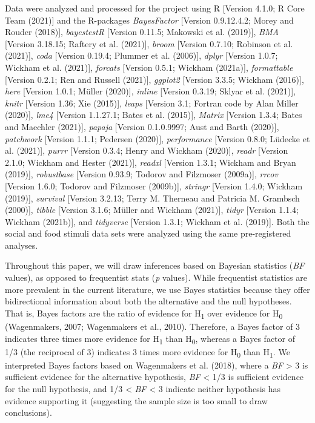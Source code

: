 \documentclass[
  english,
  ,doc,floatsintext]{apa6}
\begin{document}
Data were analyzed and processed for the project using R {[}Version 4.1.0; R Core Team (2021){]} and the R-packages \emph{BayesFactor} {[}Version 0.9.12.4.2; Morey and Rouder (2018){]}, \emph{bayestestR} {[}Version 0.11.5; Makowski et al. (2019){]}, \emph{BMA} {[}Version 3.18.15; Raftery et al. (2021){]}, \emph{broom} {[}Version 0.7.10; Robinson et al. (2021){]}, \emph{coda} {[}Version 0.19.4; Plummer et al. (2006){]}, \emph{dplyr} {[}Version 1.0.7; Wickham et al. (2021){]}, \emph{forcats} {[}Version 0.5.1; Wickham (2021a){]}, \emph{formattable} {[}Version 0.2.1; Ren and Russell (2021){]}, \emph{ggplot2} {[}Version 3.3.5; Wickham (2016){]}, \emph{here} {[}Version 1.0.1; Müller (2020){]}, \emph{inline} {[}Version 0.3.19; Sklyar et al. (2021){]}, \emph{knitr} {[}Version 1.36; Xie (2015){]}, \emph{leaps} {[}Version 3.1; Fortran code by Alan Miller (2020){]}, \emph{lme4} {[}Version 1.1.27.1; Bates et al. (2015){]}, \emph{Matrix} {[}Version 1.3.4; Bates and Maechler (2021){]}, \emph{papaja} {[}Version 0.1.0.9997; Aust and Barth (2020){]}, \emph{patchwork} {[}Version 1.1.1; Pedersen (2020){]}, \emph{performance} {[}Version 0.8.0; Lüdecke et al. (2021){]}, \emph{purrr} {[}Version 0.3.4; Henry and Wickham (2020){]}, \emph{readr} {[}Version 2.1.0; Wickham and Hester (2021){]}, \emph{readxl} {[}Version 1.3.1; Wickham and Bryan (2019){]}, \emph{robustbase} {[}Version 0.93.9; Todorov and Filzmoser (2009a){]}, \emph{rrcov} {[}Version 1.6.0; Todorov and Filzmoser (2009b){]}, \emph{stringr} {[}Version 1.4.0; Wickham (2019){]}, \emph{survival} {[}Version 3.2.13; Terry M. Therneau and Patricia M. Grambsch (2000){]}, \emph{tibble} {[}Version 3.1.6; Müller and Wickham (2021){]}, \emph{tidyr} {[}Version 1.1.4; Wickham (2021b){]}, and \emph{tidyverse} {[}Version 1.3.1; Wickham et al. (2019){]}. Both the social and food stimuli data sets were analyzed using the same pre-registered analyses.

Throughout this paper, we will draw inferences based on Bayesian statistics (\emph{BF} values), as opposed to frequentist stats (\emph{p} values). While frequentist statistics are more prevalent in the current literature, we use Bayes statistics because they offer bidirectional information about both the alternative and the null hypotheses. That is, Bayes factors are the ratio of evidence for H\textsubscript{1} over evidence for H\textsubscript{0} (Wagenmakers, 2007; Wagenmakers et al., 2010). Therefore, a Bayes factor of 3 indicates three times more evidence for H\textsubscript{1} than H\textsubscript{0}, whereas a Bayes factor of 1/3 (the reciprocal of 3) indicates 3 times more evidence for H\textsubscript{0} than H\textsubscript{1}. We interpreted Bayes factors based on Wagenmakers et al. (2018), where a \emph{BF} \textgreater{} 3 is sufficient evidence for the alternative hypothesis, \emph{BF} \textless{} 1/3 is sufficient evidence for the null hypothesis, and 1/3 \textless{} \emph{BF} \textless{} 3 indicate neither hypothesis has evidence supporting it (suggesting the sample size is too small to draw conclusions).
\end{document}
